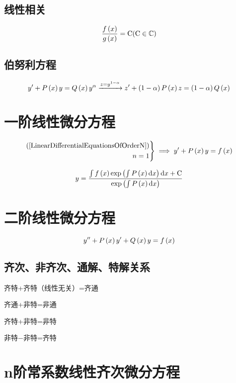 \documentclass{article}
\begin{document}
\subsection{线性相关}

\[\frac{f\left(x\right)}{g\left(x\right)}=\mathrm C(\mathrm C\in\mathbb C)\]

\subsection{伯努利方程}

\[y^\prime+P\left(x\right)y=Q\left(x\right)y^\alpha\xrightarrow{z=y^{1-\alpha}} z^\prime+\left(1-\alpha\right)P\left(x\right)z=\left(1-\alpha\right)Q\left(x\right)\]

\section{一阶线性微分方程}

\begin{definition}
    \[\left.\begin{aligned}
            \left(\ref{LinearDifferentialEquationsOfOrderN}\right) \\
            n=1
        \end{aligned}\right\}
        \implies
        y^\prime+P\left(x\right)y=f\left(x\right)\]
\end{definition}

\begin{theorem}[通解]
    \[y=\frac{\int{f\left(x\right)\exp\left(\int P\left(x\right)\mathrm dx\right)\mathrm dx}+\mathrm C}{\exp\left(\int P\left(x\right)\mathrm d x\right)}\]
\end{theorem}

\section{二阶线性微分方程}

\begin{definition}[]
    \[y^{\prime\prime}+P\left(x\right)y^\prime+Q\left(x\right)y=f\left(x\right)\]
\end{definition}

\subsection{齐次、非齐次、通解、特解关系}

齐特+齐特（线性无关）=齐通

齐通+非特=非通

齐特+非特=非特

非特$-$非特=齐特

\section{n阶常系数线性齐次微分方程}
\end{document}
